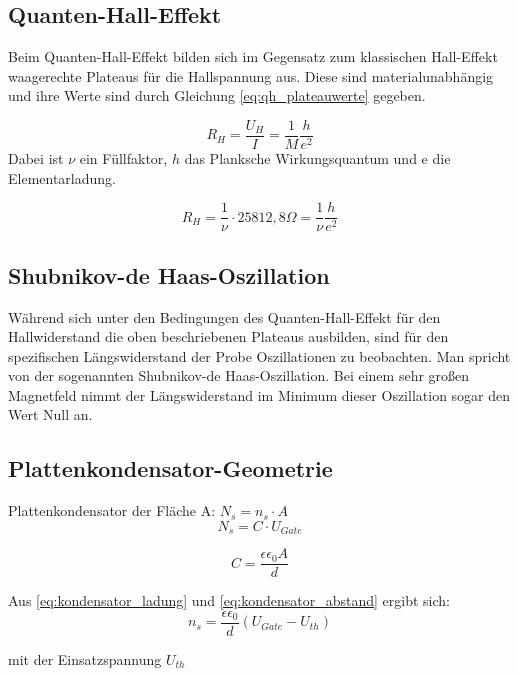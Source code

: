 \subsection{Quanten-Hall-Effekt}

Beim Quanten-Hall-Effekt bilden sich im Gegensatz zum klassischen Hall-Effekt waagerechte Plateaus für die Hallspannung aus. Diese sind materialunabhängig und ihre Werte sind durch Gleichung \ref{eq:qh_plateauwerte} gegeben. 


\begin{equation}
R_H=\frac{U_H}{I}=\frac{1}{M}\frac{h}{e^2}
\label{eq:U_Hall_simpel}
\end{equation}
Dabei ist $\nu$ ein Füllfaktor, $h$ das Planksche Wirkungsquantum und e die Elementarladung. 

\begin{equation}
R_H=\frac{1}{\nu}\cdot 25812,8\Omega =\frac{1}{\nu} \frac{h}{e^2}
\label{eq:qh_plateauwerte}
\end{equation}



\subsection{Shubnikov-de Haas-Oszillation}

Während sich unter den Bedingungen des Quanten-Hall-Effekt für den Hallwiderstand die oben beschriebenen Plateaus ausbilden, sind für den spezifischen Längswiderstand der Probe Oszillationen zu beobachten. Man spricht von der sogenannten Shubnikov-de Haas-Oszillation. Bei einem sehr großen Magnetfeld nimmt der Längswiderstand im Minimum dieser Oszillation sogar den Wert Null an.





\subsection{Plattenkondensator-Geometrie}

Plattenkondensator der Fläche A: $N_s=n_s \cdot A$ 
\begin{equation}
N_s=C \cdot U_{Gate}
\label{eq:kondensator_ladung}
\end{equation}

\begin{equation}
C=\frac{\epsilon \epsilon_0 A}{d}
\label{eq:kondensator_abstand}
\end{equation}


Aus \ref{eq:kondensator_ladung} und \ref{eq:kondensator_abstand} ergibt sich:
\begin{equation}
n_s=\frac{\epsilon \epsilon_0}{d}(U_{Gate}-U_{th})
\label{eq:kondens_lad_und_abst}
\end{equation}

mit der Einsatzspannung $U_{th}$


